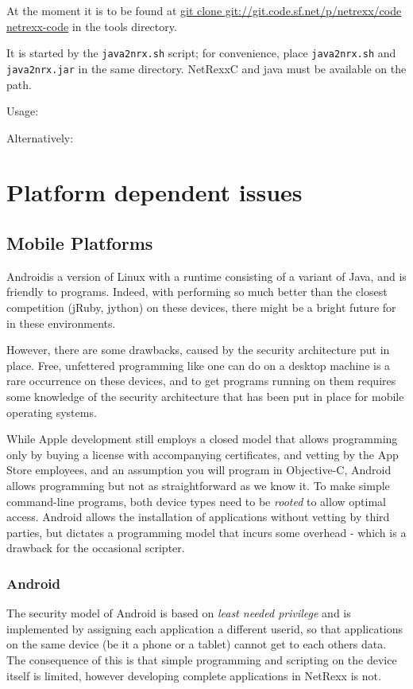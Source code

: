 {At the moment it is to be found at \url{git clone git://git.code.sf.net/p/netrexx/code netrexx-code} in the tools directory.

It is started by the \texttt{java2nrx.sh} script; for convenience, place \texttt{java2nrx.sh} and \texttt{java2nrx.jar} in the
same directory. NetRexxC and java must be available on the path.

Usage:

Alternatively:


\chapter{Platform dependent issues}
\section{Mobile Platforms}
Android\texttrademark is a version of Linux with a runtime consisting
of a variant of Java, and is friendly to \nr{}
programs. Indeed, with \nr{} performing so much better than the closest
competition (jRuby, jython) on these devices, there might be a bright
future for \nr{} in these environments. 

However, there are some drawbacks, caused by the security architecture
put in place. Free, unfettered programming like one can do on a
desktop machine is a rare occurrence on these devices, and to get
programs running on them requires some knowledge of the security
architecture that has been put in place for mobile operating systems.

While Apple development still employs a closed model that allows programming only by
buying a license with accompanying certificates, and vetting by the
App Store employees, and an assumption you will program in
Objective-C, Android allows programming but not as straightforward as
we know it. To make simple command-line \nr{} programs, both device
types need to be \emph{rooted} to allow optimal access. Android allows
the installation of applications without vetting by third parties, but
dictates a programming model that incurs some overhead - which is a
drawback for the occasional scripter.
\subsection{Android}
The security model of Android is based on \emph{least needed
  privilege} and is implemented by assigning each application a
different userid, so that applications on the same device (be it a
phone or a tablet) cannot get to each others data. The consequence of
this is that simple \nr{} programming and scripting on the device itself is limited, however developing complete applications in NetRexx is not.

}
